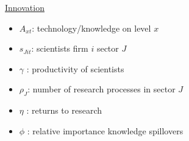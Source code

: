 \documentclass[11pt,aspectratio=169]{beamer}
\begin{document}
\begin{frame}{\hyperlink{modma}{Innovation}}
\begin{minipage}[t!]{0.46\textwidth}
	\vspace{0mm}
	\begin{itemize}
		\item[] $A_{xt}$: technology/knowledge on level $x$
		\vspace{-7mm}		
		\item[] $s_{Jit}$: scientists firm $i$ sector $J$
		\vspace{-2mm}
		\item[] $\gamma$ : productivity of scientists
	\end{itemize}
\end{minipage}
\hspace{-5mm}
\vspace{-5mm}
\begin{minipage}[t!]{0.54\textwidth}
	\vspace{0mm}
	\begin{itemize}	
		\item[] {$\rho_J$: number of research processes in sector $J$}
		\vspace{-2mm}			
		\item[] $\eta$ : returns to research
		\vspace{-2mm}			
		\item[] $\phi$ : relative importance knowledge spillovers
	\end{itemize}
\end{minipage}
\end{frame}
\end{document}

